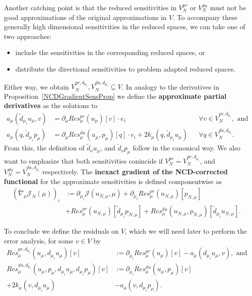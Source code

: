 Another catching point is that the reduced sensitivities in $V_N^{pr}$ or $V_N^{du}$ must not be good approximations of the original approximations in $V$.
To accompany these generally high dimensional sensitivities in the reduced spaces, we can take one of two approaches:
\begin{itemize}
    \item include the sensitivities in the corresponding reduced spaces, or
    \item distribute the directional sensitivities to problem adapted reduced spaces.
\end{itemize}
Either way, we obtain $V_N^{pr, d_{\mu_i}}, V_N^{du, d_{\mu_i}} \subseteq V$.
In analogy to the derivatives in Proposition~\ref{NCDGradientSensProp} we define the \textbf{approximate partial derivatives} as the solutions to
\begin{align*}
    a_\mu(\tilde{d}_{\mu_i} u_\mu, v) &= \partial_\mu Res_\mu^{pr}(u_\mu)[v] \cdot e_i &&\forall v \in V_N^{pr, d_{\mu_i}}, \text{ and} \\
    a_\mu(q, \tilde{d}_{\mu_i} p_\mu) &= \partial_\mu Res_\mu^{du}(u_\mu, p_\mu)[q] \cdot e_i + 2 k_\mu(q, \tilde{d}_{\mu_i} u_\mu) &&\forall q \in V_N^{du, d_{\mu_i}}.
\end{align*}
From this, the definition of $\tilde{d}_{\nu} u_\mu$, and $\tilde{d}_{\nu} p_\mu$ follow in the canonical way.
We also want to emphasize that both sensitivities conincide if $V_N^{pr} = V_N^{pr, d_{\mu_i}}$, and $V_N^{du} = V_N^{du, d_{\mu_i}}$ respectively.
The \textbf{inexact gradient of the NCD-corrected functional} for the approximate sensitivities is defined componentwise as
\begin{align*}
    {\left( \tilde{\nabla}_\mu \mathcal{J}_N(\mu) \right)}_i &:= \partial_{\mu_i} \mathcal{J}(u_{N, \mu}, \mu) + \partial_{\mu_i} Res_\mu^{pr}(u_{N, \mu})[p_{N, \mu}] \\
    &+ Res_\mu^{pr}(u_{N, \mu})[\tilde{d}_{\mu_i} p_{N, \mu}] + Res_\mu^{du}(u_{N, \mu}, p_{N, \mu})[\tilde{d}_{\mu_i} u_{N, \mu}].
\end{align*}

To conclude we define the residuals on $V$, which we will need later to perform the error analysis, for some $v \in V$ by
\begin{align*}
    Res_\mu^{pr, d_{\mu_i}}(u_\mu, d_{\mu_i} u_\mu)[v] &:= \partial_{\mu_i} Res_\mu^{pr}(u_\mu)[v] - a_\mu(d_{\mu_i} u_\mu, v), \text{ and} \\
    Res_\mu^{du, d_{\mu_i}}(u_\mu, p_\mu, d_{\mu_i} u_\mu, d_{\mu_i} p_\mu)[v] &:= \partial_{\mu_i} Res_\mu^{du}(u_\mu, p_\mu)[v] \\
    + 2 k_\mu(v, d_{\mu_i} u_\mu) &- a_\mu(v, d_{\mu_i} p_\mu).
\end{align*}


